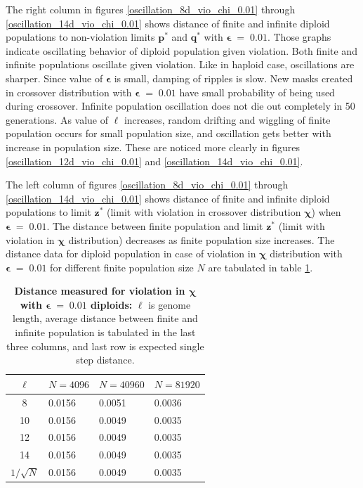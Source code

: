 \clearpage

The right column in figures \ref{oscillation_8d_vio_chi_0.01} through \ref{oscillation_14d_vio_chi_0.01} 
shows distance of finite and infinite diploid populations to non-violation limits $\bm{p^\ast}$ and $\bm{q^\ast}$ with $\bm{\epsilon} \;=\; 0.01$. 
Those graphs indicate oscillating behavior of diploid population given violation. 
Both finite and infinite populations oscillate given violation. Like in haploid case, oscillations are sharper. Since value of $\bm{\epsilon}$ 
is small, damping of ripples is slow. New masks created in crossover distribution with $\bm{\epsilon} \;=\; 0.01$ have small 
probability of being used during crossover. Infinite population oscillation does not die out completely in 50 generations. As value of $\ell$ 
increases, random drifting and wiggling of finite population occurs for small population size, and oscillation gets better with increase in population size. 
These are noticed more clearly in figures \ref{oscillation_12d_vio_chi_0.01} and \ref{oscillation_14d_vio_chi_0.01}.

The left column of figures \ref{oscillation_8d_vio_chi_0.01} through \ref{oscillation_14d_vio_chi_0.01} 
shows distance of finite and infinite diploid populations to limit $\bm{z^\ast}$ 
(limit with violation in crossover distribution $\bm{\chi}$) when $\bm{\epsilon} \;=\; 0.01$. 
The distance between finite population and limit $\bm{z}^\ast$ (limit with violation in $\bm{\chi}$ distribution) 
decreases as finite population size increases. 
The distance data for diploid population in case of violation in $\bm{\chi}$ distribution 
with $\bm{\epsilon} \;=\; 0.01$ for different finite population size $N$ are tabulated in table \ref{distanceChiDipEps0.01}.


\begin{table}[ht]
\caption{\textbf{Distance measured for violation in $\bm{\chi}$ with $\bm{\epsilon} \;=\; 0.01$ diploids:} $\ell$ is genome length, 
average distance between finite and infinite population is tabulated in the last three columns, and last row is expected single step distance.}
\centering
\begin{tabularx}{0.75\textwidth}{ c *{3}{X}}
\toprule
$\ell$ & $N = 4096$ & $N = 40960$ & $N = 81920$  \\
\midrule
8 & 0.0156	&  0.0051	& 0.0036 \\
10 & 0.0156	&  0.0049	& 0.0035 \\
12 & 0.0156	&  0.0049	& 0.0035 \\
14 & 0.0156	&  0.0049	& 0.0035 \\
\midrule
$1/\sqrt{N}$ & 0.0156 & 0.0049 & 0.0035 \\
\bottomrule
\end{tabularx}
\label{distanceChiDipEps0.01}
\end{table} 

